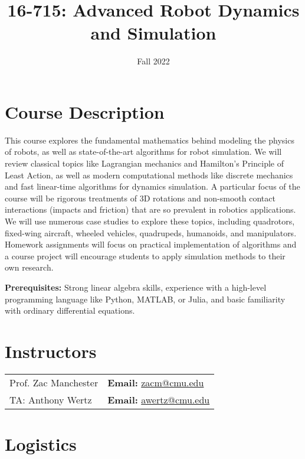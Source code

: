\documentclass[11pt,letterpaper]{article}
\title{16-715: Advanced Robot Dynamics and Simulation}
\author{Fall 2022}
\date{}
\begin{document}
\maketitle

\section*{Course Description}

This course explores the fundamental mathematics behind modeling the physics of robots, as well as state-of-the-art algorithms for robot simulation. We will review classical topics like Lagrangian mechanics and Hamilton's Principle of Least Action, as well as modern computational methods like discrete mechanics and fast linear-time algorithms for dynamics simulation. A particular focus of the course will be rigorous treatments of 3D rotations and non-smooth contact interactions (impacts and friction) that are so prevalent in robotics applications. We will use numerous case studies to explore these topics, including quadrotors, fixed-wing aircraft, wheeled vehicles, quadrupeds, humanoids, and manipulators. Homework assignments will focus on practical implementation of algorithms and a course project will encourage students to apply simulation methods to their own research.

\medskip
\noindent
\textbf{Prerequisites:} Strong linear algebra skills, experience with a high-level programming language like Python, MATLAB, or Julia, and basic familiarity with ordinary differential equations.

\section*{Instructors}

\begin{center}
\begin{tabular}{l l}
	Prof. Zac Manchester & \textbf{Email:} \href{mailto:zacm@cmu.edu}{zacm@cmu.edu} \\
	TA: Anthony Wertz & \textbf{Email:} \href{mailto:awertz@cmu.edu}{awertz@cmu.edu}
\end{tabular}
\end{center}

\section*{Logistics}
\end{document}
